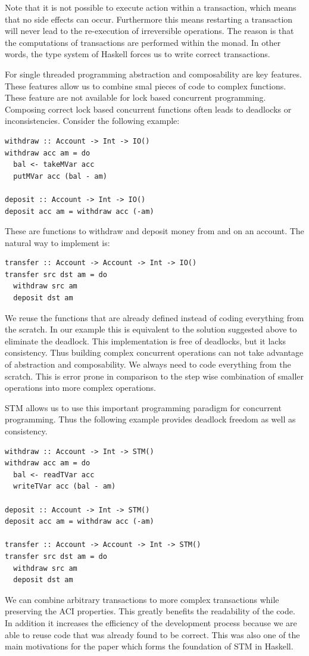 Note that it is not possible to execute  action within a transaction, which means that no side effects can occur. Furthermore this means
restarting a transaction will never lead to the re-execution of irreversible operations. The reason is that the computations of transactions
are performed within the  monad. In other words, the type system of Haskell forces us to write correct transactions. 
 
For single threaded programming abstraction and composability are key features. These features allow us to combine smal pieces
of code to complex functions. These feature are not available for lock based concurrent programming. Composing correct lock based
concurrent functions often leads to deadlocks or inconsistencies. Consider the following example:
\begin{lstlisting}
withdraw :: Account -> Int -> IO()
withdraw acc am = do 
  bal <- takeMVar acc 
  putMVar acc (bal - am)
 
deposit :: Account -> Int -> IO()
deposit acc am = withdraw acc (-am)
\end{lstlisting}
These are functions to withdraw and deposit money from and on an account. The natural way to implement  is:
\begin{lstlisting}
transfer :: Account -> Account -> Int -> IO()
transfer src dst am = do
  withdraw src am
  deposit dst am
\end{lstlisting}
We reuse the functions that are already defined instead of coding everything from the scratch. In our example this is equivalent 
to the solution suggested above to eliminate the deadlock. This implementation is free of deadlocks, but it lacks consistency.
Thus building complex concurrent operations can not take advantage of abstraction and composability. We always need to code
everything from the scratch. This is error prone in comparison to the step wise combination of smaller operations into 
more complex operations.

STM allows us to use this important programming paradigm for concurrent programming. Thus the following example provides
deadlock freedom as well as consistency.
\begin{lstlisting}
withdraw :: Account -> Int -> STM()
withdraw acc am = do 
  bal <- readTVar acc 
  writeTVar acc (bal - am)
 
deposit :: Account -> Int -> STM()
deposit acc am = withdraw acc (-am)

transfer :: Account -> Account -> Int -> STM()
transfer src dst am = do
  withdraw src am
  deposit dst am
\end{lstlisting}
We can combine arbitrary transactions to more complex transactions while preserving the ACI properties. This greatly benefits the 
readability of the code. In addition it increases the efficiency of the development process because we are able to reuse code
that was already found to be correct. This was also one of the main motivations for the paper \parencite{STMBase} which forms the foundation
of STM in Haskell. 

